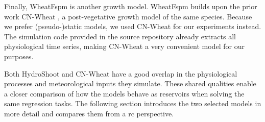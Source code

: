 Finally, WheatFspm \citep{gauthier_functional_2020} is another growth model.
WheatFspm builds upon the prior work CN-Wheat \citep{barillot_cn-wheat_2016}, a post-vegetative growth model of the same species.
Because we prefer (pseudo-)static models, we used CN-Wheat for our experiments instead.
The simulation code provided in the source repository already extracts all physiological time series, making CN-Wheat a very convenient model for our purposes.

Both HydroShoot and CN-Wheat have a good overlap in the physiological processes and meteorological inputs they simulate. 
These shared qualities enable a closer comparison of how the models behave as reservoirs when solving the same regression tasks.
The following section introduces the two selected models in more detail and compares them from a \acrshort{rc} perspective.
